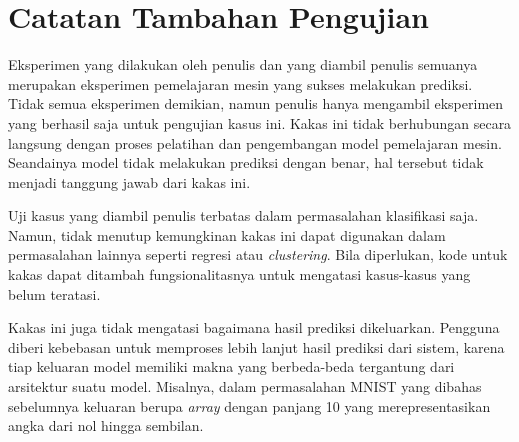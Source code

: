 \section{Catatan Tambahan Pengujian}

Eksperimen yang dilakukan oleh penulis dan yang diambil penulis semuanya merupakan eksperimen pemelajaran mesin yang sukses melakukan prediksi.
Tidak semua eksperimen demikian, namun penulis hanya mengambil eksperimen yang berhasil saja untuk pengujian kasus ini.
Kakas ini tidak berhubungan secara langsung dengan proses pelatihan dan pengembangan model pemelajaran mesin.
Seandainya model tidak melakukan prediksi dengan benar, hal tersebut tidak menjadi tanggung jawab dari kakas ini.

Uji kasus yang diambil penulis terbatas dalam permasalahan klasifikasi saja.
Namun, tidak menutup kemungkinan kakas ini dapat digunakan dalam permasalahan lainnya seperti regresi atau \textit{clustering}.
Bila diperlukan, kode untuk kakas dapat ditambah fungsionalitasnya untuk mengatasi kasus-kasus yang belum teratasi.

Kakas ini juga tidak mengatasi bagaimana hasil prediksi dikeluarkan.
Pengguna diberi kebebasan untuk memproses lebih lanjut hasil prediksi dari sistem, karena tiap keluaran model memiliki makna yang berbeda-beda tergantung dari arsitektur suatu model.
Misalnya, dalam permasalahan MNIST yang dibahas sebelumnya keluaran berupa \textit{array} dengan panjang 10 yang merepresentasikan angka dari nol hingga sembilan.